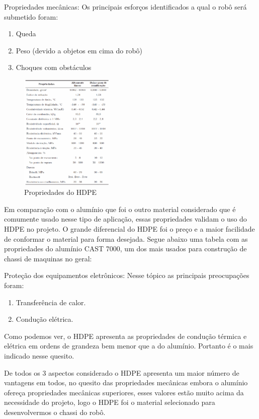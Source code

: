 Propriedades mecânicas: Os principais esforços identificados a qual o robô será submetido foram:
\begin{enumerate}
\item Queda
\item Peso (devido a objetos em cima do robô)
\item Choques com obstáculos
\end{enumerate}

\begin{figure}[H]
    \centering
    \includegraphics[width=0.4\textwidth]{figuras/tabela_pead.eps}
    \caption{Propriedades do HDPE}
    \label{fig:pead}
\end{figure}

Em comparação com o alumínio que foi o outro material considerado que é comumente usado nesse tipo de aplicação, essas propriedades
validam o uso do HDPE no projeto. O grande diferencial do HDPE foi o preço e a maior facilidade de conformar o material para forma
desejada. Segue abaixo uma tabela com as propriedades do alumínio CAST 7000, um dos mais usados para construção de chassi de maquinas no geral:

Proteção dos equipamentos eletrônicos: Nesse tópico as principais preocupações foram:
\begin{enumerate}
\item Transferência de calor.
\item Condução elétrica.
\end{enumerate}

Como podemos ver, o HDPE apresenta as propriedades de condução térmica e elétrica em ordens de grandeza bem menor que a do alumínio.
Portanto é o mais indicado nesse quesito.

De todos os 3 aspectos considerado o HDPE apresenta um maior número de vantagens em todos, no quesito das propriedades mecânicas embora
o alumínio ofereça propriedades mecânicas superiores, esses valores estão muito acima da necessidade do projeto, logo o HDPE foi o
material selecionado para desenvolvermos o chassi do robô.
 
